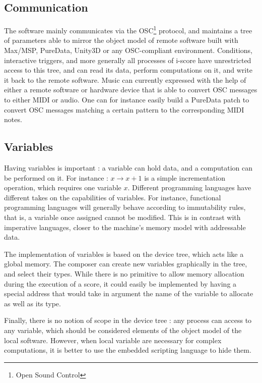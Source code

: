 \documentclass{article}
\begin{document}
\subsection{Communication}
The software mainly communicates via the OSC\footnote{Open Sound Control} protocol,  and maintains a tree of parameters able to mirror 
the object model of remote software built with Max/MSP, PureData, Unity3D or any OSC-compliant environment. 
Conditions, interactive triggers, and more generally all processes of i-score have unrestricted 
access to this tree, and can read its data, perform computations on it, and write it back to the 
remote software.
Music can currently expressed with the help of either a remote software or hardware device that is able 
to convert OSC messages to either MIDI or audio.
One can for instance easily build a PureData patch to convert OSC messages matching a certain pattern 
to the corresponding MIDI notes.

\subsection{Variables}
Having variables is important : a variable can hold data, 
and a computation can be performed on it.
For instance : $x \rightarrow x + 1$ is a simple incrementation 
operation, which requires one variable $x$.
Different programming languages have different takes on the 
capabilities of variables.
For instance, functional programming languages will generally 
behave according to immutability rules, that is, a variable once 
assigned cannot be modified.
This is in contrast with imperative languages, closer 
to the machine's memory model with addressable data.

The implementation of variables is based on the device tree, which 
acts like a global memory. 
The composer can create new variables graphically in the tree, and select their types.
While there is no primitive to allow memory allocation during the execution of a score, it could easily be implemented by having a special address that would take in argument the name of the variable to allocate as well as its type.

Finally, there is no notion of scope in the device tree : any process can access to any variable, which 
should be considered elements of the object model of the local software.
However, when local variable are necessary for complex computations, it 
is better to use the embedded scripting language to hide them.
\end{document}
